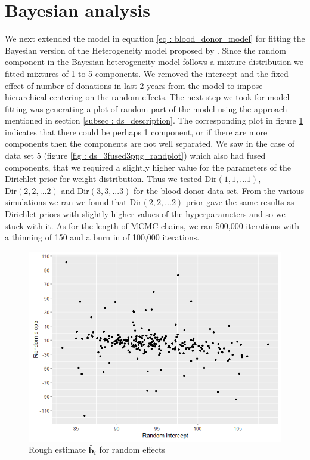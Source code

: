\section{Bayesian analysis}
\label{sec : blood_donor_bayesian_analysis}
We next extended the model in equation \ref{eq : blood_donor_model} for fitting the Bayesian version of the Heterogeneity model proposed by \citet{verbeke_linear_1996}. Since the random component in the Bayesian heterogeneity model follows a mixture distribution we fitted mixtures of 1 to 5 components. We removed the intercept and the fixed effect of number of donations in last 2 years from the model to impose hierarchical centering on the random effects. The next step we took for model fitting was generating a plot of random part of the model using the approach mentioned in section \ref{subsec : ds_description}. The corresponding plot in figure \ref{fig : rough_idea_blood_donor} indicates that there could be perhaps 1 component, or if there are more components then the components are not well separated. We saw in the case of data set 5 (figure \ref{fig : ds_3fused3ppg_randplot}) which also had fused components, that we required a slightly higher value for the parameters of the Dirichlet prior for weight distribution. Thus we tested $\text{Dir}(1, 1,...1)$, $\text{Dir}(2, 2,...2)$ and $\text{Dir}(3, 3,...3)$ for the blood donor data set. From the various simulations we ran we found that $\text{Dir}(2, 2,...2)$ prior gave the same results as Dirichlet priors with slightly higher values of the hyperparameters and so we stuck with it. As for the length of MCMC chains, we ran 500,000 iterations with a thinning of 150 and a burn in of 100,000 iterations.\\

\begin{figure}
	\centering
	\includegraphics[scale=0.5]{mainmatter/chapter_6_blood_donor/rough_estimate_random_effects.png}
	\caption{Rough estimate $\tilde{\boldsymbol{b}_i}$ for random effects}
	\label{fig : rough_idea_blood_donor}
\end{figure}

